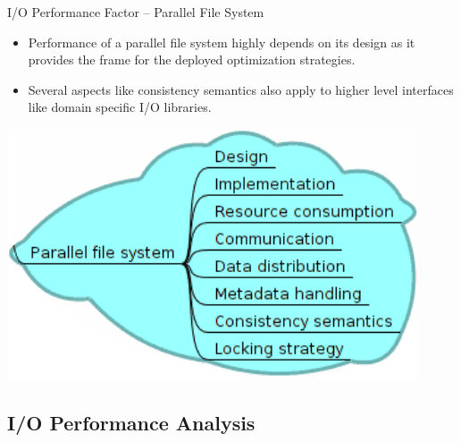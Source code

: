 \documentclass[compress,11pt,xcolor=svgnames,aspectratio=169]{beamer}
\begin{document}
\begin{frame}[fragile]{I/O Performance Factor -- Parallel File System}

\begin{itemize}
\setlength\itemsep{0.5cm}

  \item Performance of a parallel file system highly depends on its design as it provides the frame for the deployed optimization strategies.

  \item Several aspects like consistency semantics also apply to higher level interfaces like domain specific I/O libraries.

\end{itemize}

\begin{center}
\includegraphics[scale=0.5]{fig/tree-io-pfs}
\end{center}

\nocite{SOPPOAASLK13}

\end{frame}

\subsection{I/O Performance Analysis}
\end{document}
